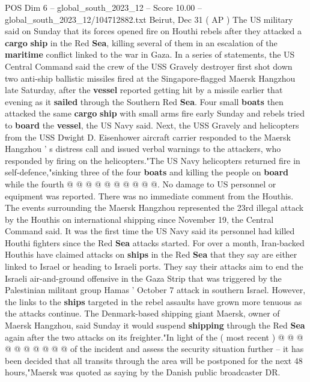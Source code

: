 \begin{textsample}{POS Dim 6 – global\_south\_2023\_12 – Score 10.00 – global\_south\_2023\_12/104712882.txt}  \label{ex:f6_pos_121}
Beirut, Dec 31 ( AP ) The US military said on Sunday that its forces opened fire on Houthi rebels after they attacked a \textbf{cargo} \textbf{ship} in the Red \textbf{Sea}, killing several of them in an escalation of the \textbf{maritime} conflict linked to the war in Gaza.
In a series of statements, the US Central Command said the crew of the USS Gravely destroyer first shot down two anti-ship ballistic missiles fired at the Singapore-flagged Maersk Hangzhou late Saturday, after the \textbf{vessel} reported getting hit by a missile earlier that evening as it \textbf{sailed} through the Southern Red \textbf{Sea}.
Four small \textbf{boats} then attacked the same \textbf{cargo} \textbf{ship} with small arms fire early Sunday and rebels tried to \textbf{board} the \textbf{vessel}, the US Navy said.
Next, the USS Gravely and helicopters from the USS Dwight D.
Eisenhower aircraft carrier responded to the Maersk Hangzhou ' s distress call and issued verbal warnings to the attackers, who responded by firing on the helicopters."The US Navy helicopters returned fire in self-defence,"sinking three of the four \textbf{boats} and killing the people on \textbf{board} while the fourth @ @ @ @ @ @ @ @ @ @.
No damage to US personnel or equipment was reported.
There was no immediate comment from the Houthis.
The events surrounding the Maersk Hangzhou represented the 23rd illegal attack by the Houthis on international shipping since November 19, the Central Command said.
It was the first time the US Navy said its personnel had killed Houthi fighters since the Red \textbf{Sea} attacks started.
For over a month, Iran-backed Houthis have claimed attacks on \textbf{ships} in the Red \textbf{Sea} that they say are either linked to Israel or heading to Israeli ports.
They say their attacks aim to end the Israeli air-and-ground offensive in the Gaza Strip that was triggered by the Palestinian militant group Hamas ' October 7 attack in southern Israel.
However, the links to the \textbf{ships} targeted in the rebel assaults have grown more tenuous as the attacks continue.
The Denmark-based shipping giant Maersk, owner of Maersk Hangzhou, said Sunday it would suspend \textbf{shipping} through the Red \textbf{Sea} again after the two attacks on its freighter."In light of the ( most recent ) @ @ @ @ @ @ @ @ @ @ of the incident and assess the security situation further -- it has been decided that all transits through the area will be postponed for the next 48 hours,"Maersk was quoted as saying by the Danish public broadcaster DR.

\end{textsample}
